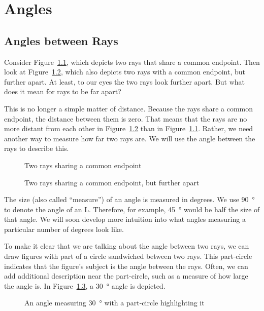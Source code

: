 \documentclass[a4paper,10pt]{report}
\begin{document}
\chapter{Angles}

\section{Angles between Rays}

Consider Figure~\ref{an:tworays}, which depicts two rays that share a common
endpoint. Then look at Figure~\ref{an:tworaysfar}, which also depicts two rays
with a common endpoint, but further apart. At least, to our eyes the two rays
look further apart. But what does it mean for rays to be far apart?

This is no longer a simple matter of distance. Because the rays share a common
endpoint, the distance between them is zero. That means that the rays are no
more distant from each other in Figure~\ref{an:tworaysfar} than in
Figure~\ref{an:tworays}. Rather, we need another way to measure how far two rays
are. We will use the \gls{angle} between the rays to describe this.

\begin{figure}
 \fgTwoRays{}

 \caption{Two rays sharing a common endpoint}
 \label{an:tworays}
\end{figure}

\begin{figure}
 \fgTwoRaysFar{}

 \caption{Two rays sharing a common endpoint, but further apart}
 \label{an:tworaysfar}
\end{figure}

The size (also called ``measure'') of an angle is measured in degrees. We use
\SI{90}{\degree} to denote the angle of an L. Therefore, for example,
\SI{45}{\degree} would be half the size of that angle. We will soon develop more
intuition into what angles measuring a particular number of degrees look like.

To make it clear that we are talking about the angle between two rays, we can
draw figures with part of a circle sandwiched between two rays. This part-circle
indicates that the figure's subject is the angle between the rays. Often, we can
add additional description near the part-circle, such as a measure of how large
the angle is. In Figure~\ref{an:anglethirty}, a \SI{30}{\degree} angle is
depicted.

\begin{figure}

 \caption{An angle measuring \SI{30}{\degree} with a part-circle highlighting
 it}
 \label{an:anglethirty}
\end{figure}
\end{document}
